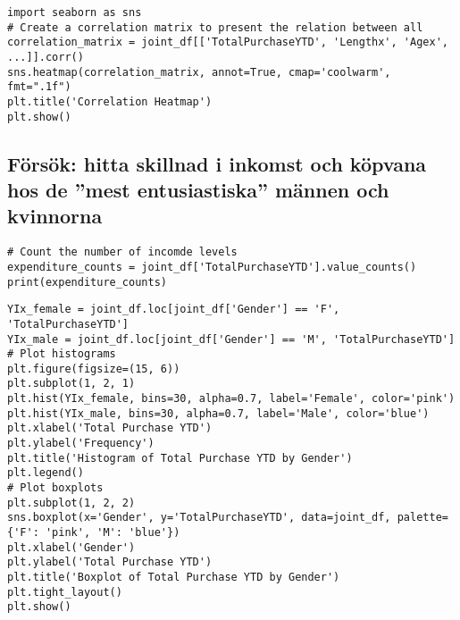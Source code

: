 \documentclass[]{article}
\begin{document}
\begin{lstlisting}
import seaborn as sns
# Create a correlation matrix to present the relation between all 
correlation_matrix = joint_df[['TotalPurchaseYTD', 'Lengthx', 'Agex', ...]].corr()
sns.heatmap(correlation_matrix, annot=True, cmap='coolwarm', fmt=".1f")
plt.title('Correlation Heatmap')
plt.show()
\end{lstlisting}


\subsection{Försök: hitta skillnad i inkomst och köpvana hos de ''mest entusiastiska'' männen och kvinnorna}

\begin{lstlisting}
# Count the number of incomde levels
expenditure_counts = joint_df['TotalPurchaseYTD'].value_counts()
print(expenditure_counts)
\end{lstlisting}

\begin{lstlisting}
YIx_female = joint_df.loc[joint_df['Gender'] == 'F', 'TotalPurchaseYTD']
YIx_male = joint_df.loc[joint_df['Gender'] == 'M', 'TotalPurchaseYTD']
# Plot histograms
plt.figure(figsize=(15, 6))
plt.subplot(1, 2, 1)
plt.hist(YIx_female, bins=30, alpha=0.7, label='Female', color='pink')
plt.hist(YIx_male, bins=30, alpha=0.7, label='Male', color='blue')
plt.xlabel('Total Purchase YTD')
plt.ylabel('Frequency')
plt.title('Histogram of Total Purchase YTD by Gender')
plt.legend()
# Plot boxplots
plt.subplot(1, 2, 2)
sns.boxplot(x='Gender', y='TotalPurchaseYTD', data=joint_df, palette={'F': 'pink', 'M': 'blue'})
plt.xlabel('Gender')
plt.ylabel('Total Purchase YTD')
plt.title('Boxplot of Total Purchase YTD by Gender')
plt.tight_layout()
plt.show()
\end{lstlisting}
\end{document}
